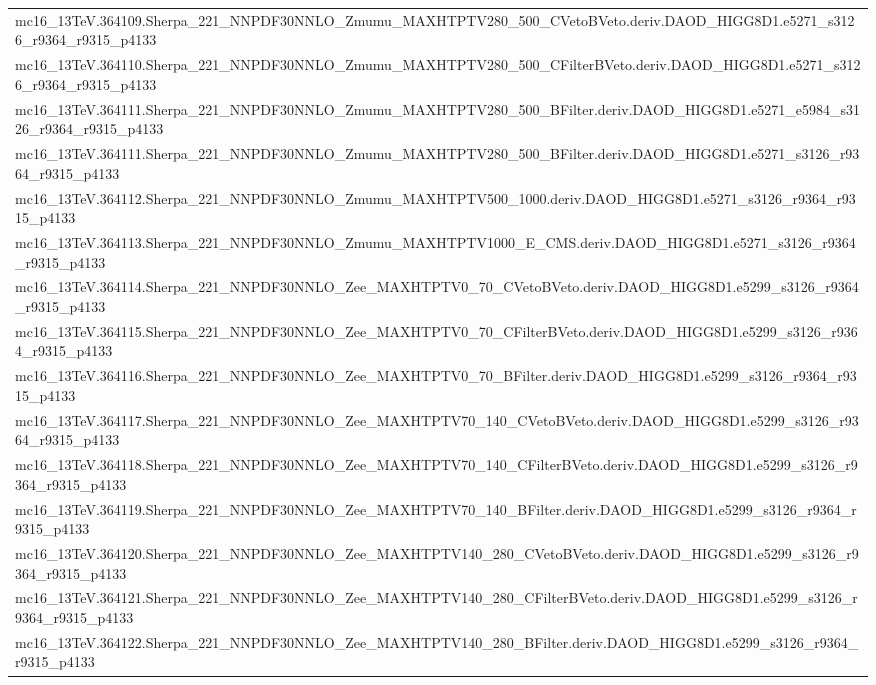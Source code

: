 \begin{adjustwidth}{-3em}{-3em}
\begin{longtable}{l}
mc16\_13TeV.364109.Sherpa\_221\_NNPDF30NNLO\_Zmumu\_MAXHTPTV280\_500\_CVetoBVeto.deriv.DAOD\_HIGG8D1.e5271\_s3126\_r9364\_r9315\_p4133 \\
mc16\_13TeV.364110.Sherpa\_221\_NNPDF30NNLO\_Zmumu\_MAXHTPTV280\_500\_CFilterBVeto.deriv.DAOD\_HIGG8D1.e5271\_s3126\_r9364\_r9315\_p4133 \\
mc16\_13TeV.364111.Sherpa\_221\_NNPDF30NNLO\_Zmumu\_MAXHTPTV280\_500\_BFilter.deriv.DAOD\_HIGG8D1.e5271\_e5984\_s3126\_r9364\_r9315\_p4133 \\
mc16\_13TeV.364111.Sherpa\_221\_NNPDF30NNLO\_Zmumu\_MAXHTPTV280\_500\_BFilter.deriv.DAOD\_HIGG8D1.e5271\_s3126\_r9364\_r9315\_p4133 \\
mc16\_13TeV.364112.Sherpa\_221\_NNPDF30NNLO\_Zmumu\_MAXHTPTV500\_1000.deriv.DAOD\_HIGG8D1.e5271\_s3126\_r9364\_r9315\_p4133 \\
mc16\_13TeV.364113.Sherpa\_221\_NNPDF30NNLO\_Zmumu\_MAXHTPTV1000\_E\_CMS.deriv.DAOD\_HIGG8D1.e5271\_s3126\_r9364\_r9315\_p4133 \\
mc16\_13TeV.364114.Sherpa\_221\_NNPDF30NNLO\_Zee\_MAXHTPTV0\_70\_CVetoBVeto.deriv.DAOD\_HIGG8D1.e5299\_s3126\_r9364\_r9315\_p4133 \\
mc16\_13TeV.364115.Sherpa\_221\_NNPDF30NNLO\_Zee\_MAXHTPTV0\_70\_CFilterBVeto.deriv.DAOD\_HIGG8D1.e5299\_s3126\_r9364\_r9315\_p4133 \\
mc16\_13TeV.364116.Sherpa\_221\_NNPDF30NNLO\_Zee\_MAXHTPTV0\_70\_BFilter.deriv.DAOD\_HIGG8D1.e5299\_s3126\_r9364\_r9315\_p4133 \\
mc16\_13TeV.364117.Sherpa\_221\_NNPDF30NNLO\_Zee\_MAXHTPTV70\_140\_CVetoBVeto.deriv.DAOD\_HIGG8D1.e5299\_s3126\_r9364\_r9315\_p4133 \\
mc16\_13TeV.364118.Sherpa\_221\_NNPDF30NNLO\_Zee\_MAXHTPTV70\_140\_CFilterBVeto.deriv.DAOD\_HIGG8D1.e5299\_s3126\_r9364\_r9315\_p4133 \\
mc16\_13TeV.364119.Sherpa\_221\_NNPDF30NNLO\_Zee\_MAXHTPTV70\_140\_BFilter.deriv.DAOD\_HIGG8D1.e5299\_s3126\_r9364\_r9315\_p4133 \\
mc16\_13TeV.364120.Sherpa\_221\_NNPDF30NNLO\_Zee\_MAXHTPTV140\_280\_CVetoBVeto.deriv.DAOD\_HIGG8D1.e5299\_s3126\_r9364\_r9315\_p4133 \\
mc16\_13TeV.364121.Sherpa\_221\_NNPDF30NNLO\_Zee\_MAXHTPTV140\_280\_CFilterBVeto.deriv.DAOD\_HIGG8D1.e5299\_s3126\_r9364\_r9315\_p4133 \\
mc16\_13TeV.364122.Sherpa\_221\_NNPDF30NNLO\_Zee\_MAXHTPTV140\_280\_BFilter.deriv.DAOD\_HIGG8D1.e5299\_s3126\_r9364\_r9315\_p4133 \\

\end{longtable}
\end{adjustwidth}
